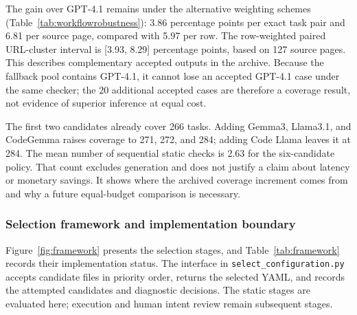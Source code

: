 

The gain over GPT-4.1 remains under the alternative weighting schemes (Table~\ref{tab:workflowrobustness}): 3.86 percentage points per exact task pair and 6.81 per source page, compared with 5.97 per row. The row-weighted paired URL-cluster interval is [3.93, 8.29] percentage points, based on 127 source pages. This describes complementary accepted outputs in the archive. Because the fallback pool contains GPT-4.1, it cannot lose an accepted GPT-4.1 case under the same checker; the 20 additional accepted cases are therefore a coverage result, not evidence of superior inference at equal cost.

The first two candidates already cover 266 tasks. Adding Gemma3, Llama3.1, and CodeGemma raises coverage to 271, 272, and 284; adding Code Llama leaves it at 284. The mean number of sequential static checks is 2.63 for the six-candidate policy. That count excludes generation and does not justify a claim about latency or monetary savings. It shows where the archived coverage increment comes from and why a future equal-budget comparison is necessary.

\subsubsection{Selection framework and implementation boundary}
Figure~\ref{fig:framework} presents the selection stages, and Table~\ref{tab:framework} records their implementation status. The interface in \texttt{select\_configuration.py} accepts candidate files in priority order, returns the selected YAML, and records the attempted candidates and diagnostic decisions. The static stages are evaluated here; execution and human intent review remain subsequent stages.

